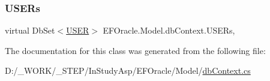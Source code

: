\mbox{\label{class_e_f_oracle_1_1_model_1_1db_context_aa300c467cc435086d3610121fc2a6545}} 
\subsubsection{\texorpdfstring{U\+S\+E\+Rs}{USERs}}
{\footnotesize\ttfamily virtual Db\+Set$<$\hyperlink{class_e_f_oracle_1_1_model_1_1_u_s_e_r}{U\+S\+ER}$>$ E\+F\+Oracle.\+Model.\+db\+Context.\+U\+S\+E\+Rs\hspace{0.3cm}{\ttfamily [get]}, {\ttfamily [set]}}



The documentation for this class was generated from the following file\+:\begin{DoxyCompactItemize}
\item 
D\+:/\+\_\+\+W\+O\+R\+K/\+\_\+\+S\+T\+E\+P/\+In\+Study\+Asp/\+E\+F\+Oracle/\+Model/\hyperlink{db_context_8cs}{db\+Context.\+cs}\end{DoxyCompactItemize}
